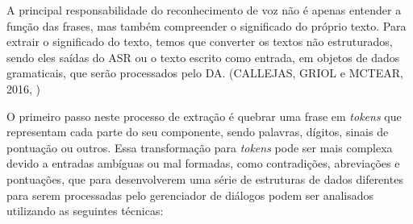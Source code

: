 \documentclass[
	12pt,				%
	oneside,
	a4paper,			%
	english,			%
	french,				%
	spanish,			%
	brazil				%
	]{abntex2}
\begin{document}
A principal responsabilidade do reconhecimento de voz não é apenas entender a função das frases, mas também compreender o significado do próprio texto.
Para extrair o significado do texto, temos que converter os textos não estruturados, sendo eles saídas do ASR ou o texto escrito como entrada, em objetos de dados gramaticais, que serão processados pelo DA. 
(CALLEJAS, GRIOL e MCTEAR, 2016, \cite{conversational-interface})

O primeiro passo neste processo de extração é quebrar uma frase em \emph{tokens} que representam cada parte do seu componente, sendo palavras, dígitos, sinais de pontuação ou outros. Essa transformação para \emph{tokens} pode ser mais complexa devido a entradas ambíguas ou mal formadas, como contradições, abreviações e pontuações, que para desenvolverem uma série de estruturas de dados diferentes para serem processadas pelo gerenciador de diálogos podem ser analisados utilizando as seguintes técnicas:
\end{document}
